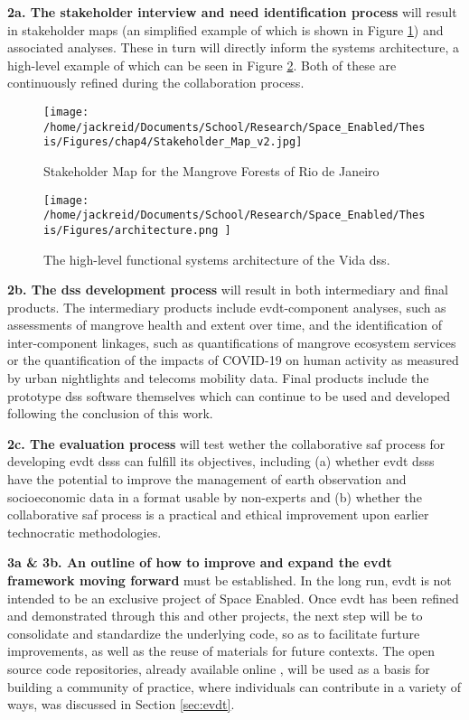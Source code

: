 \documentclass[notitlepage]{article}
\begin{document}
\textbf{2a. The stakeholder interview and need identification process} will result in stakeholder maps (an simplified example of which is shown in Figure \ref{fig:rio_stakemap}) and associated analyses. These in turn will directly inform the systems architecture, a high-level example of which can be seen in Figure \ref{fig:architecture}. Both of these are continuously refined during the collaboration process.

\begin{figure}[h]
	\centering
	\texttt{[image: /home/jackreid/Documents/School/Research/Space\_Enabled/Thesis/Figures/chap4/Stakeholder\_Map\_v2.jpg]}
	\caption[Stakeholder Map for the Mangrove Forests of Reio de Janeiro]{Stakeholder Map for the Mangrove Forests of Rio de Janeiro}
	\label{fig:rio_stakemap}
\end{figure}

\begin{figure}[h]
	\centering
	\texttt{[image: /home/jackreid/Documents/School/Research/Space\_Enabled/Thesis/Figures/architecture.png
]}
	\caption{The high-level functional systems architecture of the Vida \ac{dss}.}
	\label{fig:architecture}
\end{figure}


\textbf{2b. The \ac{dss} development process} will result in both intermediary and final products. The intermediary products include \ac{evdt}-component analyses, such as assessments of mangrove health and extent over time, and the identification of inter-component linkages, such as quantifications of mangrove ecosystem services or the quantification of the impacts of COVID-19 on human activity as measured by urban nightlights and telecoms mobility data. Final products include the prototype \ac{dss} software themselves which can continue to be used and developed following the conclusion of this work.

\textbf{2c. The evaluation process} will test wether the collaborative \ac{saf} process for developing \ac{evdt} \acp{dss} can fulfill its objectives, including (a) whether \ac{evdt} \acp{dss} have the potential to improve the management of earth observation and socioeconomic data in a format usable by non-experts and (b) whether the collaborative \ac{saf} process is a practical and ethical improvement upon earlier technocratic methodologies. 

\textbf{3a \& 3b. An outline of how to improve and expand the \ac{evdt} framework moving forward} must be established. In the long run, \ac{evdt} is not intended to be an exclusive project of Space Enabled. Once \ac{evdt} has been refined and demonstrated through this and other projects, the next step will be to consolidate and standardize the underlying code, so as to facilitate furture improvements, as well as the reuse of materials for future contexts. The open source code repositories, already available online \cite{bluerasterBlueRasterVida2021,reidEVDTRepository2020,reidMITVidaRepository2021}, will be used as a basis for building a community of practice, where individuals can contribute in a variety of ways, was discussed in Section \ref{sec:evdt}.
\end{document}
